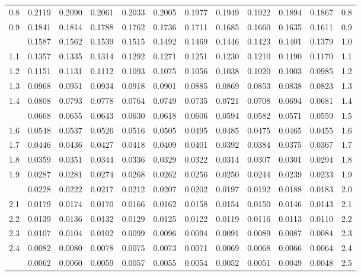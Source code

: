 \documentclass[10pt]{article}
\begin{document}
\begin{center}
\begin{longtable}{@{}r!{\vrule width 0.8pt\hspace{0.55em}}rrrrrrrrrr!{\hspace{0.55em}\vrule width 0.8pt}r@{}}
0.8 & 0.2119 & 0.2090 & 0.2061 & 0.2033 & 0.2005 & 0.1977 & 0.1949 & 0.1922 & 0.1894 & 0.1867 & 0.8 \\
0.9 & 0.1841 & 0.1814 & 0.1788 & 0.1762 & 0.1736 & 0.1711 & 0.1685 & 0.1660 & 0.1635 & 0.1611 & 0.9 \\
 & 0.1587 & 0.1562 & 0.1539 & 0.1515 & 0.1492 & 0.1469 & 0.1446 & 0.1423 & 0.1401 & 0.1379 & 1.0 \\
1.1 & 0.1357 & 0.1335 & 0.1314 & 0.1292 & 0.1271 & 0.1251 & 0.1230 & 0.1210 & 0.1190 & 0.1170 & 1.1 \\
1.2 & 0.1151 & 0.1131 & 0.1112 & 0.1093 & 0.1075 & 0.1056 & 0.1038 & 0.1020 & 0.1003 & 0.0985 & 1.2 \\
1.3 & 0.0968 & 0.0951 & 0.0934 & 0.0918 & 0.0901 & 0.0885 & 0.0869 & 0.0853 & 0.0838 & 0.0823 & 1.3 \\
1.4 & 0.0808 & 0.0793 & 0.0778 & 0.0764 & 0.0749 & 0.0735 & 0.0721 & 0.0708 & 0.0694 & 0.0681 & 1.4 \\
 & 0.0668 & 0.0655 & 0.0643 & 0.0630 & 0.0618 & 0.0606 & 0.0594 & 0.0582 & 0.0571 & 0.0559 & 1.5 \\
1.6 & 0.0548 & 0.0537 & 0.0526 & 0.0516 & 0.0505 & 0.0495 & 0.0485 & 0.0475 & 0.0465 & 0.0455 & 1.6 \\
1.7 & 0.0446 & 0.0436 & 0.0427 & 0.0418 & 0.0409 & 0.0401 & 0.0392 & 0.0384 & 0.0375 & 0.0367 & 1.7 \\
1.8 & 0.0359 & 0.0351 & 0.0344 & 0.0336 & 0.0329 & 0.0322 & 0.0314 & 0.0307 & 0.0301 & 0.0294 & 1.8 \\
1.9 & 0.0287 & 0.0281 & 0.0274 & 0.0268 & 0.0262 & 0.0256 & 0.0250 & 0.0244 & 0.0239 & 0.0233 & 1.9 \\
 & 0.0228 & 0.0222 & 0.0217 & 0.0212 & 0.0207 & 0.0202 & 0.0197 & 0.0192 & 0.0188 & 0.0183 & 2.0 \\
2.1 & 0.0179 & 0.0174 & 0.0170 & 0.0166 & 0.0162 & 0.0158 & 0.0154 & 0.0150 & 0.0146 & 0.0143 & 2.1 \\
2.2 & 0.0139 & 0.0136 & 0.0132 & 0.0129 & 0.0125 & 0.0122 & 0.0119 & 0.0116 & 0.0113 & 0.0110 & 2.2 \\
2.3 & 0.0107 & 0.0104 & 0.0102 & 0.0099 & 0.0096 & 0.0094 & 0.0091 & 0.0089 & 0.0087 & 0.0084 & 2.3 \\
2.4 & 0.0082 & 0.0080 & 0.0078 & 0.0075 & 0.0073 & 0.0071 & 0.0069 & 0.0068 & 0.0066 & 0.0064 & 2.4 \\
 & 0.0062 & 0.0060 & 0.0059 & 0.0057 & 0.0055 & 0.0054 & 0.0052 & 0.0051 & 0.0049 & 0.0048 & 2.5 \\

\end{longtable}
\end{center}
\end{document}
